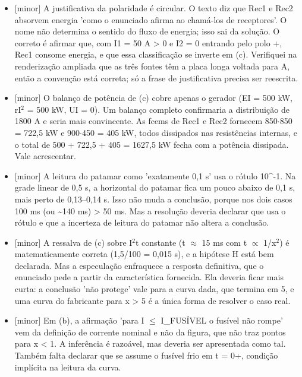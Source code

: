 \documentclass{article}%
\begin{document}
\begin{itemize}%
\item%
{[}minor{]} A justificativa da polaridade é circular. O texto diz que Rec1 e Rec2 absorvem energia 'como o enunciado afirma ao chamá{-}los de receptores'. O nome não determina o sentido do fluxo de energia; isso sai da solução. O correto é afirmar que, com I1 = 50 A > 0 e I2 = 0 entrando pelo polo +, Rec1 consome energia, e que essa classificação se inverte em (c). Verifiquei na renderização ampliada que as três fontes têm a placa longa voltada para A, então a convenção está correta; só a frase de justificativa precisa ser reescrita.%
\item%
{[}minor{]} O balanço de potência de (c) cobre apenas o gerador (EI = 500 kW, rI$^2$ = 500 kW, UI = 0). Um balanço completo confirmaria a distribuição de 1800 A e seria mais convincente. As fcems de Rec1 e Rec2 fornecem 850$\cdot$850 = 722,5 kW e 900$\cdot$450 = 405 kW, todos dissipados nas resistências internas, e o total de 500 + 722,5 + 405 = 1627,5 kW fecha com a potência dissipada. Vale acrescentar.%
\item%
{[}minor{]} A leitura do patamar como 'exatamente 0,1 s' usa o rótulo 10\^{}{-}1. Na grade linear de 0,5 s, a horizontal do patamar fica um pouco abaixo de 0,1 s, mais perto de 0,13--0,14 s. Isso não muda a conclusão, porque nos dois casos 100 ms (ou \textasciitilde{}140 ms) > 50 ms. Mas a resolução deveria declarar que usa o rótulo e que a incerteza de leitura do patamar não altera a conclusão.%
\item%
{[}minor{]} A ressalva de (c) sobre I$^2$t constante (t $\approx$ 15 ms com t $\propto$ 1/x$^2$) é matematicamente correta (1,5/100 = 0,015 s), e a hipótese H está bem declarada. Mas a especulação enfraquece a resposta definitiva, que o enunciado pede a partir da característica fornecida. Ela deveria ficar mais curta: a conclusão 'não protege' vale para a curva dada, que termina em 5, e uma curva do fabricante para x > 5 é a única forma de resolver o caso real.%
\item%
{[}minor{]} Em (b), a afirmação 'para I $\leq$ I\_FUSÍVEL o fusível não rompe' vem da definição de corrente nominal e não da figura, que não traz pontos para x < 1. A inferência é razoável, mas deveria ser apresentada como tal. Também falta declarar que se assume o fusível frio em t = 0+, condição implícita na leitura da curva.%
\end{itemize}%
\end{document}
